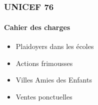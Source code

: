 \subsection{} %

\begin{frame}
\frametitle{UNICEF 76}
\framesubtitle{Cahier des charges}
	\begin{itemize}
		\item Plaidoyers dans les \'ecoles
		\item Actions frimousses
		\item Villes Amies des Enfants
		\item Ventes ponctuelles
	\end{itemize}
\end{frame}